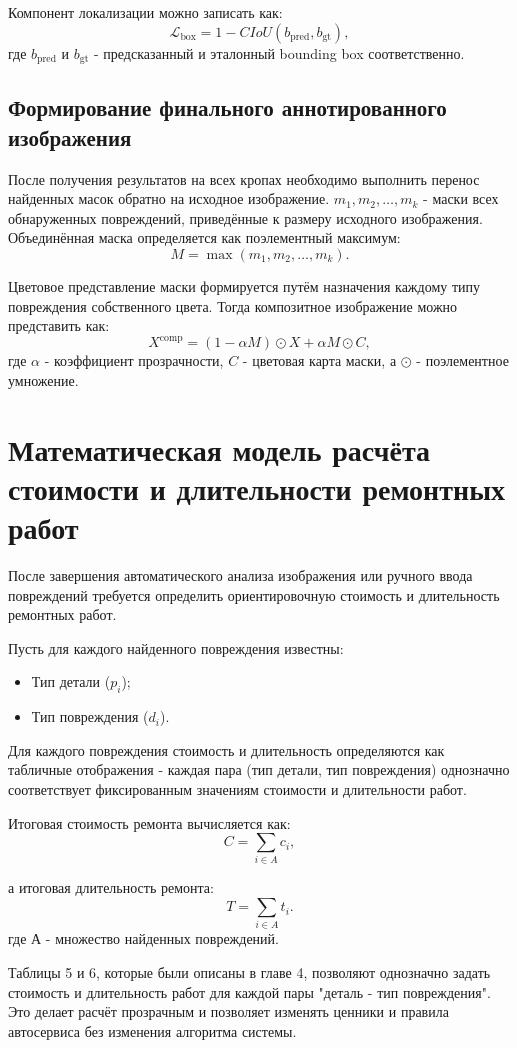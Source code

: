 Компонент локализации можно записать как:
\[
\mathcal{L}_{\text{box}} = 1 - CIoU(b_{\text{pred}}, b_{\text{gt}}),
\]
где $b_{\text{pred}}$ и $b_{\text{gt}}$ - предсказанный и эталонный bounding box соответственно.


\subsection{Формирование финального аннотированного изображения}

После получения результатов на всех кропах необходимо выполнить перенос найденных масок обратно на исходное изображение. $m_1, m_2, \dots, m_k$ - маски всех обнаруженных повреждений, приведённые к размеру исходного изображения. Объединённая маска определяется как поэлементный максимум:
\[
M = \max(m_1, m_2, \ldots, m_k).
\]

Цветовое представление маски формируется путём назначения каждому типу повреждения собственного цвета. Тогда композитное изображение можно представить как:
\[
X^{\text{comp}} = (1 - \alpha M)\odot X + \alpha M \odot C,
\]
где $\alpha$ - коэффициент прозрачности, $C$ - цветовая карта маски, а $\odot$ - поэлементное умножение.


\section{Математическая модель расчёта стоимости и длительности ремонтных работ}

После завершения автоматического анализа изображения или ручного ввода повреждений требуется определить ориентировочную стоимость и длительность ремонтных работ.

Пусть для каждого найденного повреждения известны:
\begin{itemize}
    \item Тип детали ($p_i$);
    \item Тип повреждения ($d_i$).
\end{itemize}

Для каждого повреждения стоимость и длительность определяются как табличные отображения - каждая пара (тип детали, тип повреждения) однозначно соответствует фиксированным значениям стоимости и длительности работ.

Итоговая стоимость ремонта вычисляется как:
\[
C = \sum_{i \in A} c_i,
\]

а итоговая длительность ремонта:
\[
T = \sum_{i \in A} t_i.
\]
где А - множество найденных повреждений.

Таблицы 5 и 6, которые были описаны в главе 4, позволяют однозначно задать стоимость и длительность работ для каждой пары "деталь - тип повреждения". Это делает расчёт прозрачным и позволяет изменять ценники и правила автосервиса без изменения алгоритма системы.

